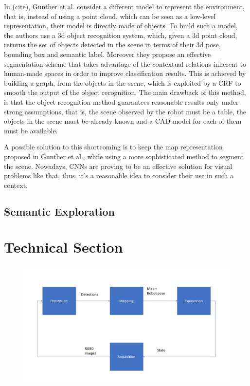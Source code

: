 \documentclass{article}
\begin{document}
	In (cite), Gunther et al. consider a different model to represent the environment, that is, instead of using a point cloud, which can be seen as a low-level representation, their model is directly made of objects. To build such a model, the authors use a 3d object recognition system, which, given a 3d point cloud, returns the set of objects detected in the scene in terms of their 3d pose, bounding box and semantic label. Moreover they propose an effective segmentation scheme that takes advantage of the contextual relations inherent to human-made spaces in order to improve classification results. This is achieved by building a graph, from the objects in the scene, which is exploited by a CRF to smooth the output of the object recognition. The main drawback of this method, is that the object recognition method guarantees reasonable results only under strong assumptions, that is, the scene observed by the robot must be a table, the objects in the scene must be already known and a CAD model for each of them must be available.
	
	A possible solution to this shortcoming is to keep the map representation proposed in Gunther et al., while using a more sophisticated method to segment the scene. Nowadays, CNNs are proving to be an effective solution for visual problems like that, thus, it's a reasonable idea to consider their use in such a context.
		
	\subsection*{Semantic Exploration}
	
	\section*{Technical Section}
	
    \begin{figure}[htbp]
		\centering
		\includegraphics[width=\linewidth]{pics/pipeline}
	\end{figure}	
	
	
	
	
	
\end{document}

